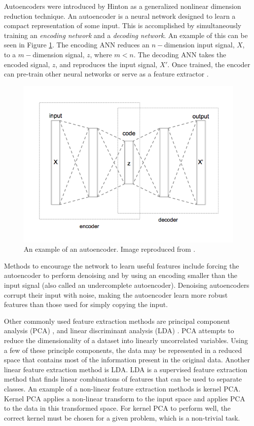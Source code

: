 Autoencoders were introduced by Hinton \cite{Hinton2006} as a generalized nonlinear dimension reduction technique. An autoencoder is a neural network designed to learn a compact representation of some input. This is accomplished by simultaneously training an \textit{encoding network} and a \textit{decoding network}. An example of this can be seen in Figure \ref{fig:Autoencoder_structure}. The encoding ANN reduces an $n-$dimension input signal, $X$, to a $m-$dimension signal, $z$, where $m < n$. The decoding ANN takes the encoded signal, $z$, and reproduces the input signal, $X'$. Once trained, the encoder can pre-train other neural networks or serve as a feature extractor \cite{Erhan2010,CHARTE2018}. 

\begin{figure}[H]
	\centering
	\includegraphics[width=0.8\linewidth]{images/Autoencoder_structure}
	\caption{An example of an autoencoder. Image reproduced from \cite{wiki:AutoencoderStructure}.}
	\label{fig:Autoencoder_structure}
\end{figure}

Methods to encourage the network to learn useful features include forcing the autoencoder to perform denoising \cite{Vincent2008, Vincent2010} and by using an encoding smaller than the input signal (also called an undercomplete autoencoder). Denoising autoencoders corrupt their input with noise, making the autoencoder learn more robust features than those used for simply copying the input. 


Other commonly used feature extraction methods are principal component analysis (PCA) \cite{Jolliffe2002}, and linear discriminant analysis (LDA) \cite{Welling2007}. PCA attempts to reduce the dimensionality of a dataset into linearly uncorrelated variables. Using a few of these principle components, the data may be represented in a reduced space that contains most of the information present in the original data. Another linear feature extraction method is LDA. LDA is a supervised feature extraction method that finds linear combinations of features that can be used to separate classes. An example of a non-linear feature extraction methods is kernel PCA. Kernel PCA applies a non-linear transform to the input space and applies PCA to the data in this transformed space. For kernel PCA to perform well, the correct kernel must be chosen for a given problem, which is a non-trivial task.

